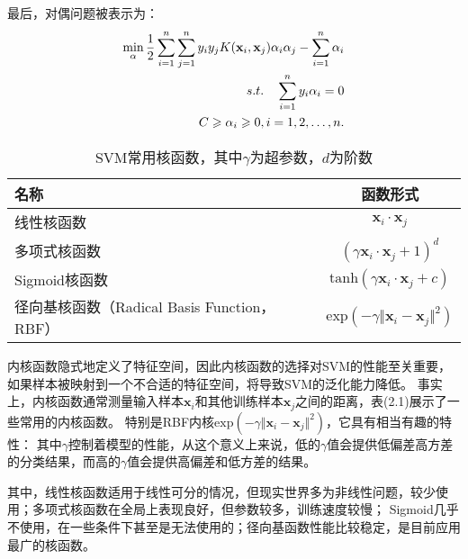 最后，对偶问题被表示为：
\begin{align}
    \min_\alpha\frac{1}{2}\sum_{i=1}^n\sum_{j=1}^ny_iy_jK(\mathbf{x}_i,\mathbf{x}_j)\alpha_i\alpha_j-\sum_{i=1}^n\alpha_i \\
    s.t.\quad \sum_{i=1}^ny_i\alpha_i=0 \notag \\
    C\geq\alpha_i\geq0,i=1,2,\ldots,n.\notag
\end{align}

\begin{table}[ht]
    \centering
    \caption{SVM常用核函数，其中$\gamma$为超参数，$d$为阶数}
    \begin{tabular}{lc}
        \hline
        {名称} & {函数形式}\\
        \hline
        {线性核函数} & {$\mathbf{x}_i\cdot\mathbf{x}_j$}\\
        {多项式核函数} & {$(\gamma\mathbf{x}_i\cdot\mathbf{x}_j+1)^d$}\\
        {Sigmoid核函数} & {$\mathrm{tanh}(\gamma\mathbf{x}_i\cdot\mathbf{x}_j+c)$}\\
        {径向基核函数（Radical Basis Function，RBF）} & {$\mathrm{exp}(-\gamma\Vert\mathbf{x}_i-\mathbf{x}_j\Vert^2)$}\\
        \hline
    \end{tabular}
\end{table}

内核函数隐式地定义了特征空间，因此内核函数的选择对SVM的性能至关重要，如果样本被映射到一个不合适的特征空间，将导致SVM的泛化能力降低。
事实上，内核函数通常测量输入样本$\mathbf{x}_i$和其他训练样本$\mathbf{x}_j$之间的距离，表(2.1)展示了一些常用的内核函数。
特别是RBF内核$\mathrm{exp}(-\gamma\Vert\mathbf{x}_i-\mathbf{x}_j\Vert^2)$，它具有相当有趣的特性：
其中$\gamma$控制着模型的性能，从这个意义上来说，低的$\gamma$值会提供低偏差高方差的分类结果，而高的$\gamma$值会提供高偏差和低方差的结果。

其中，线性核函数适用于线性可分的情况，但现实世界多为非线性问题，较少使用；多项式核函数在全局上表现良好，但参数较多，训练速度较慢；
Sigmoid几乎不使用，在一些条件下甚至是无法使用的；径向基函数性能比较稳定，是目前应用最广的核函数。